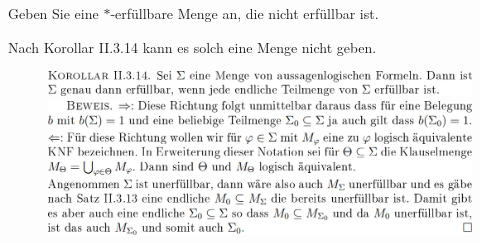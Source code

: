 
\begin{exercise}[26]

Geben Sie eine $\ast$-erfüllbare Menge an, die nicht erfüllbar ist.

\end{exercise}


\begin{solution}

\phantom{}

Nach Korollar II.3.14 kann es solch eine Menge nicht geben.


\begin{figure}
    \begin{boxedin}
        \begin{center}
            \includegraphics[width = 0.75 \textwidth]{../../../Fundament-LaTeX/images/LGM/LGM - Korollar II.3.14.png} \\
            \vspace{0.5 cm}
            \includegraphics[width = 0.75 \textwidth]{../../../Fundament-LaTeX/images/LGM/LGM - Korollar II.3.14 - Beweis.png}
        \end{center}
    \end{boxedin}
\end{figure}

\end{solution}
